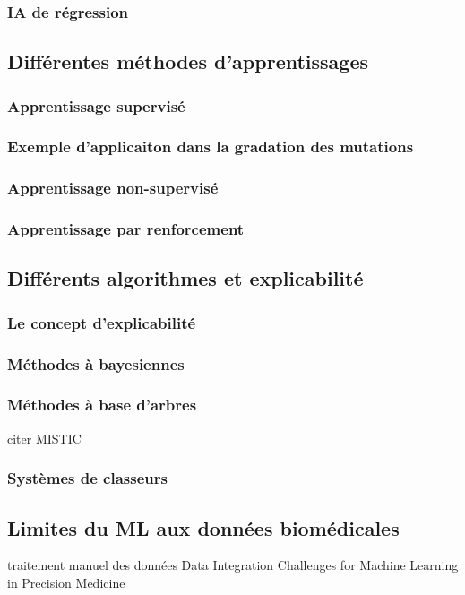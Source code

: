 \subsubsection{IA de régression}
\subsection{Différentes méthodes d'apprentissages}
\subsubsection{Apprentissage supervisé}
\subsubsection{Exemple d'applicaiton dans la gradation des mutations}
\subsubsection{Apprentissage non-supervisé}
\subsubsection{Apprentissage par renforcement}
\subsection{Différents algorithmes et explicabilité}
\subsubsection{Le concept d'explicabilité}
\subsubsection{Méthodes à bayesiennes}
\subsubsection{Méthodes à base d'arbres}
citer MISTIC
\subsubsection{Systèmes de classeurs}

\subsection{Limites du ML aux données biomédicales}
traitement manuel des données 
Data Integration Challenges for Machine Learning in Precision Medicine